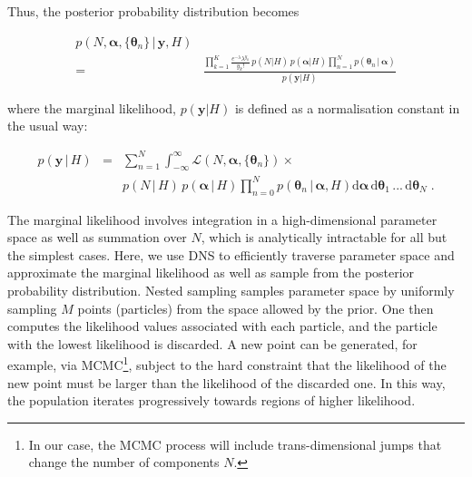 \documentclass[12pt]{emulateapj}
\newcommand{\given}{\,|\,}
\newcommand{\dd}{\mathrm{d}}
\newcommand{\counts}{y}
\newcommand{\likelihood}{{\mathcal L}}
\begin{document}
Thus, the posterior probability distribution becomes

\begin{eqnarray}
p(N, \bm{\alpha}, \{\bm{\theta}_n \}  \given \bm{\counts}, H) & \\\nonumber
= &  \frac{\prod\limits_{k=1}^{K}{ \frac{e^{-\lambda} \lambda^{y_k} }{y_k! }}\, p(N|H)\, p(\bm{\alpha}|H) \prod\limits_{n=1}^{N}  p(\bm{\theta}_n\given \bm{\alpha})}{p(\bm{\counts} | H)} 
\end{eqnarray}

where the marginal likelihood, $p(\bm{\counts} | H)$ is defined as a normalisation constant in the usual way: 

\begin{eqnarray}
p(\bm{\counts} \given H) & = & \sum_{n=1}^{N} \int_{-\infty}^{\infty}{\likelihood(N, \bm{\alpha}, \{\bm{\theta}_n \})} \times \\ \nonumber
&& p(N\given H)\, p(\bm{\alpha} \given H) \prod\limits_{n=0}^{N}  p(\bm{\theta}_n\given \bm{\alpha}, H) \dd\bm{\alpha}\, \dd\bm{\theta}_1 \, ...\, \dd\bm{\theta}_N \; .
\label{eqn:marginal}
\end{eqnarray}

The marginal likelihood involves integration in a high-dimensional parameter space as well as summation over $N$, which is analytically intractable for all but the
simplest cases. Here, we use DNS to efficiently traverse parameter space and approximate the marginal 
likelihood as well as sample from the posterior probability distribution. 
Nested sampling \citep{skilling2006} samples parameter space by uniformly sampling $M$ points (particles) from the space allowed by the prior. 
One then computes the likelihood values associated with each particle, and the particle with the lowest likelihood is discarded. A new point
can be generated, for example, via MCMC\footnote{In our case, the MCMC process will include trans-dimensional jumps that change the number of components $N$.}, subject to the hard constraint that the
likelihood of the new point must be larger than the likelihood of the discarded one. In this way, the population iterates progressively towards
regions of higher likelihood.
\end{document}
